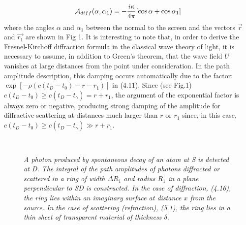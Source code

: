 {\begin{equation}
  {\cal A}_{diff}(\alpha, \alpha_1) = -\frac{i \kappa}{4 \pi}[\cos \alpha+ \cos\alpha_1]
 \end{equation} 
  where the angles $\alpha$ and $\alpha_1$ between the normal to the screen and the vectors
  $\vec{r}$ and  $\vec{r_1}$ are shown in Fig 1. It is interesting to note that, in order to 
   derive the  Fresnel-Kirchoff diffraction formula in the classical wave theory of light, it is
   necessary to assume, in addition to Green's theorem, that the wave field $U$ vanishes at
   large distances from the point under consideration. In the path amplitude description, this
    damping occurs automatically due to the factor: $\exp[-\rho(c(t_D-t_0)-r-r_1)]$ in (4.11).
     Since (see Fig.1) $c(t_D-t_0) \ge c(t_D-t_{\gamma})=r+r_1$, the argument of the exponential factor is 
    always zero or negative, producing strong damping of the amplitude for diffractive scattering
      at distances much larger than $r$ or $r_1$ since, in this case, $c(t_D-t_0) \ge c(t_D-t_{\gamma})
       \gg  r+r_1$. 

\begin{figure}[htbp]
\begin{center}
\hspace*{-0.5cm}\mbox{
}
\caption{{\sl A photon produced by spontaneous decay of an atom at S is detected
  at D. The integral of the path amplitudes of photons diffracted or scattered in a ring
 of width $\Delta R_1$ and radius $R_1$ in a plane perpendicular to SD is constructed.
 In the case of diffraction, (4.16), the ring lies within an imaginary surface at distance $x$
  from the source. In the case of scattering (refraction), (5.1), the ring lies in a thin
  sheet of transparent material of thickness $\delta$.}} 
\label{fig-fig2}
\end{center}
\end{figure}
  
}
